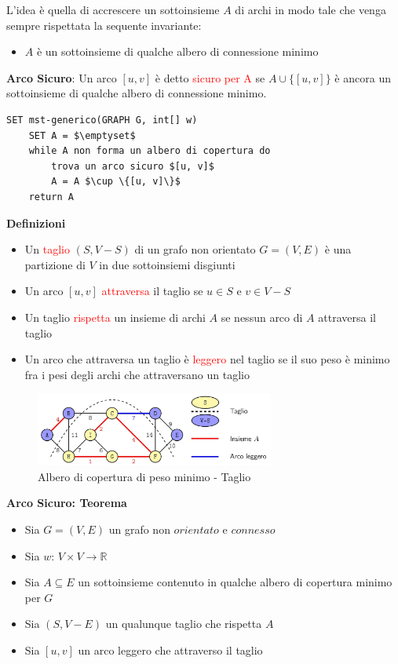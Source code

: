 \documentclass[../cheatSheetAlgoritmi.tex]{subfiles}
\begin{document}
L'idea è quella di accrescere un sottoinsieme $A$ di archi in modo tale che venga sempre rispettata la sequente invariante:
\begin{itemize}
	\item $A$ è un sottoinsieme di qualche albero di connessione minimo
\end{itemize}
\textbf{Arco Sicuro}: Un arco $[u, v]$ è detto \textcolor{red}{sicuro per A} se $A \cup \{[u,v]\}$ è ancora un sottoinsieme di qualche albero di connessione minimo.
\begin{lstlisting}[caption=Algoritmo Generico MST]
SET mst-generico(GRAPH G, int[] w)
	SET A = $\emptyset$
	while A non forma un albero di copertura do
		trova un arco sicuro $[u, v]$
		A = A $\cup \{[u, v]\}$
	return A
\end{lstlisting}
\newpage
\begin{flushleft}
\textbf{Definizioni}
\end{flushleft}
\begin{itemize}
	\item Un \textcolor{red}{taglio} $(S, V - S)$ di un grafo non orientato $G = (V, E)$ è una partizione di $V$ in due sottoinsiemi disgiunti
	\item Un arco $[u, v]$ \textcolor{red}{attraversa} il taglio se $u \in S$ e $v \in V - S$
	\item Un taglio \textcolor{red}{rispetta} un insieme di archi $A$ se nessun arco di $A$ attraversa il taglio
	\item Un arco che attraversa un taglio è \textcolor{red}{leggero} nel taglio se il suo peso è minimo fra i pesi degli archi che attraversano un taglio
\end{itemize}
\begin{figure}[h]
	\centering
	\includegraphics[width=0.7\textwidth]{../img/Greedy_4.jpg}
	\caption{Albero di copertura di peso minimo - Taglio}
\end{figure}
\textbf{Arco Sicuro: Teorema}
\begin{itemize}
	\item Sia $G = (V, E)$ un grafo non $orientato$ e $connesso$
	\item Sia $w$: $V \times V \rightarrow \mathbb{R}$
	\item Sia $A \subseteq E$ un sottoinsieme contenuto in qualche albero di copertura minimo per $G$
	\item Sia $(S, V - E)$ un qualunque taglio che rispetta $A$
	\item Sia $[u, v]$ un arco leggero che attraverso il taglio
\end{itemize}
\end{document}
